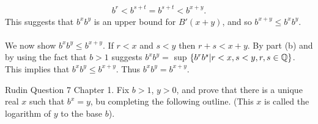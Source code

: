 \documentclass[12pt]{article}
\begin{document}
\begin{enumerate}
\begin{align*}
b^{r}<b^{s+t}=b^{s+t}< b^{x+y}.
\end{align*}
This suggests that $b^{x}b^{y}$ is an upper bound for $B'(x+y)$, and so  $b^{x+y} \leq b^{x}b^{y}$. \\ \\
We now show $ b^{x}b^{y} \leq b^{x+y}$. If $r<x$ and $s<y$ then $r+s<x+y$. By part (b) and by using the fact that $b>1$ suggests $b^{x}b^{y}=$ sup $\left\{ b^{r}b^{s} | r<x, s<y, r, s \in \mathbb{Q}\right\}$. This implies that $b^{x}b^{y} \leq b^{x+y}$. Thus $b^{x}b^{y} = b^{x+y}$.

\end{enumerate} 
\problem Rudin Question 7 Chapter 1. Fix $b>1$, $y>0$, and prove that there is a unique real $x$ such that $b^{x}=y$, bu completing the following outline. (This $x$ is called the logarithm of $y$ to the base $b$).
\end{document}
